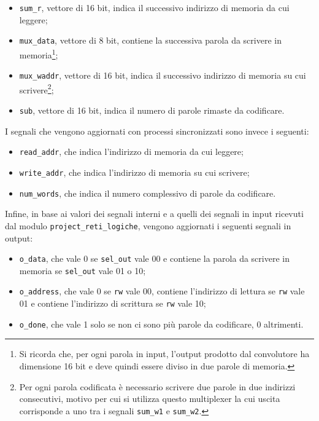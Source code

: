 \documentclass{article}
\begin{document}
			\begin{itemize}
				\item \verb|sum_r|, vettore di 16 bit, indica il successivo indirizzo di memoria
					da cui leggere;
				\item \verb|mux_data|, vettore di 8 bit, contiene la successiva parola da scrivere
					in memoria\footnote{Si ricorda che, per ogni parola in input, l'output prodotto
					dal convolutore ha dimensione 16 bit e deve quindi essere diviso in due parole
					di memoria.};
				\item \verb|mux_waddr|, vettore di 16 bit, indica il successivo indirizzo di
					memoria su cui scrivere\footnote{Per ogni parola codificata è necessario
					scrivere due parole in due indirizzi consecutivi, motivo per cui si utilizza
					questo multiplexer la cui uscita corrisponde a uno tra i segnali \verb|sum_w1| e
					\verb|sum_w2|.};
				\item \verb|sub|, vettore di 16 bit, indica il numero di parole rimaste da
					codificare.
			\end{itemize}

			I segnali che vengono aggiornati con processi sincronizzati sono invece i seguenti:

			\begin{itemize}
				\item \verb|read_addr|, che indica l'indirizzo di memoria da cui leggere;
				\item \verb|write_addr|, che indica l'indirizzo di memoria su cui scrivere;
				\item \verb|num_words|, che indica il numero complessivo di parole da codificare.
			\end{itemize}

			Infine, in base ai valori dei segnali interni e a quelli dei segnali in input
			ricevuti dal modulo \verb|project_reti_logiche|, vengono aggiornati i seguenti
			segnali in output:

			\begin{itemize}
				\item \verb|o_data|, che vale 0 se \verb|sel_out| vale 00 e contiene la parola da
					scrivere in memoria se \verb|sel_out| vale 01 o 10;
				\item \verb|o_address|, che vale 0 se \verb|rw| vale 00, contiene l'indirizzo di
					lettura se \verb|rw| vale 01 e contiene l'indirizzo di scrittura se \verb|rw|
					vale 10;
				\item \verb|o_done|, che vale 1 solo se non ci sono più parole da codificare, 0
					altrimenti.
			\end{itemize}
\end{document}
